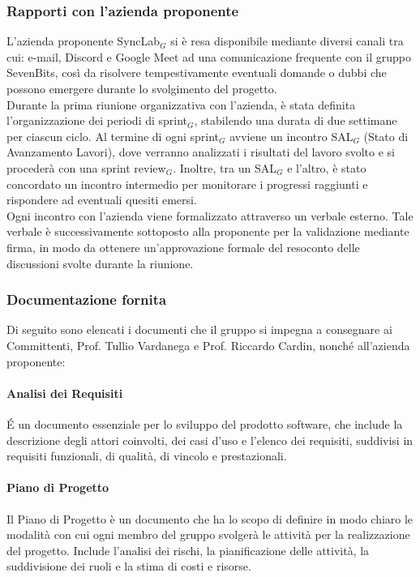 \subsubsection{Rapporti con l'azienda proponente}
L'azienda proponente SyncLab$_G$ si è resa disponibile mediante diversi canali tra cui: e-mail, Discord e Google Meet ad una comunicazione frequente con il gruppo SevenBits, così da risolvere tempestivamente eventuali domande o dubbi che possono emergere durante lo svolgimento del progetto.\\
Durante la prima riunione organizzativa con l'azienda, è stata definita l'organizzazione dei periodi di sprint$_G$, stabilendo una durata di due settimane per ciascun ciclo. Al termine di ogni sprint$_G$ avviene un incontro SAL$_G$ (Stato di Avanzamento Lavori), dove verranno analizzati i risultati del lavoro svolto e si procederà con una sprint review$_G$. Inoltre, tra un SAL$_G$ e l'altro, è stato concordato un incontro intermedio per monitorare i progressi raggiunti e rispondere ad eventuali quesiti emersi.\\
Ogni incontro con l'azienda viene formalizzato attraverso un verbale esterno. Tale verbale è successivamente sottoposto alla proponente per la validazione mediante firma, in modo da ottenere un'approvazione formale del resoconto delle discussioni svolte durante la riunione.\\

\subsubsection{Documentazione fornita}
Di seguito sono elencati i documenti che il gruppo si impegna a consegnare ai Committenti, Prof. Tullio Vardanega e Prof. Riccardo Cardin, nonché all'azienda proponente:\\

    \paragraph{Analisi dei Requisiti}
    \'E un documento essenziale per lo sviluppo del prodotto software, che include la descrizione degli attori coinvolti, dei casi d’uso e l’elenco dei requisiti, suddivisi in requisiti funzionali, di qualità, di vincolo e prestazionali.\\

    \paragraph{Piano di Progetto}
    Il Piano di Progetto è un documento che ha lo scopo di definire in modo chiaro le modalità con cui ogni membro del gruppo svolgerà le attività per la realizzazione del progetto. Include l'analisi dei rischi, la pianificazione delle attività, la suddivisione dei ruoli e la stima di costi e risorse.\\

